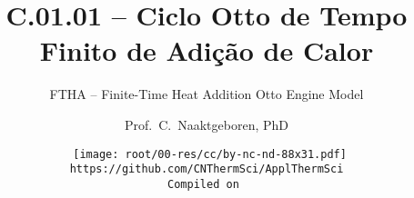 \makeatletter
\immediate{} %
\makeatother


\newcommand{\VPMS}{{\ensuremath V_{\mathrm{PMS}}}}
\newcommand{\VPMI}{{\ensuremath V_{\mathrm{PMI}}}}
\title{C.01.01 -- Ciclo Otto de Tempo Finito de Adição de Calor}
\subtitle{FTHA -- Finite-Time Heat Addition Otto Engine Model}
\author{Prof.~C.~Naaktgeboren, PhD}
\date{{\scriptsize\tt%
    \texttt{[image: root/00-res/cc/by-nc-nd-88x31.pdf]}\\[\smallskipamount]
    https://github.com/CNThermSci/ApplThermSci\\
    Compiled on 
}}

\logo{%
    \parbox{158mm}{%
        \texttt{[image: root/00-res/UTFPR/UTFPR-logo-A.pdf]}\hfill%
        \texttt{[image: root/00-res/logo/CNThermSci-logo-A.pdf]}%
}} %
\frame{\titlepage}

\frame{\tableofcontents}

